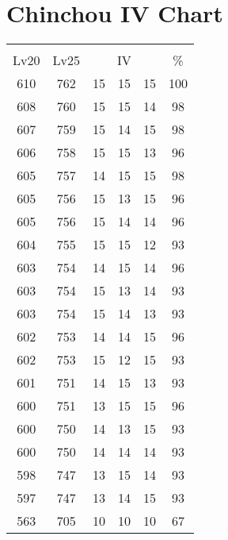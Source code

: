 \documentclass{article}%
\begin{document}
%
\normalsize%
\section{Chinchou IV Chart}%
\label{sec:Chinchou IV Chart}%
\renewcommand{\arraystretch}{1.5}%
\begin{tabular}{|c|c|c|c|c|c|}%
\hline%
\multicolumn{6}{|c|}{\textcolor{white}{ 
\linebreak{Chinchou}
}%
\cellcolor{black}}\\%
\multicolumn{1}{|c}{Lv20}&\multicolumn{1}{c|}{Lv25}&\multicolumn{3}{c|}{IV}&\multicolumn{1}{|c|}{\%}\\%
\hline%
\rowcolor{color100}%
610&762&15&15&15&100\\%
\hline%
\rowcolor{color98}%
608&760&15&15&14&98\\%
\hline%
\rowcolor{color98}%
607&759&15&14&15&98\\%
\hline%
\rowcolor{color96}%
606&758&15&15&13&96\\%
\hline%
\rowcolor{color98}%
605&757&14&15&15&98\\%
\hline%
\rowcolor{color96}%
605&756&15&13&15&96\\%
\hline%
\rowcolor{color96}%
605&756&15&14&14&96\\%
\hline%
\rowcolor{color93}%
604&755&15&15&12&93\\%
\hline%
\rowcolor{color96}%
603&754&14&15&14&96\\%
\hline%
\rowcolor{color93}%
603&754&15&13&14&93\\%
\hline%
\rowcolor{color93}%
603&754&15&14&13&93\\%
\hline%
\rowcolor{color96}%
602&753&14&14&15&96\\%
\hline%
\rowcolor{color93}%
602&753&15&12&15&93\\%
\hline%
\rowcolor{color93}%
601&751&14&15&13&93\\%
\hline%
\rowcolor{color96}%
600&751&13&15&15&96\\%
\hline%
\rowcolor{color93}%
600&750&14&13&15&93\\%
\hline%
\rowcolor{color93}%
600&750&14&14&14&93\\%
\hline%
\rowcolor{color93}%
598&747&13&15&14&93\\%
\hline%
\rowcolor{color93}%
597&747&13&14&15&93\\%
\hline%
\rowcolor{color91}%
563&705&10&10&10&67\\%
\end{tabular}

%
\end{document}
